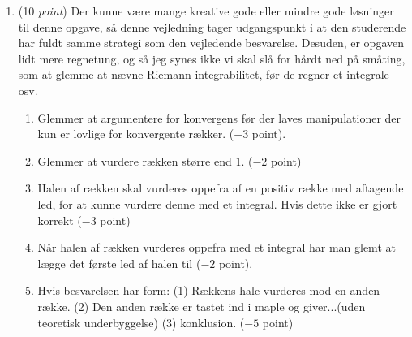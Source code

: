 \documentclass{article}
\begin{document}
\begin{opg}\hfill
	\begin{enumerate}
			\item (10 \emph{point}) Der kunne være mange kreative gode eller mindre gode løsninger til denne opgave, så denne vejledning tager udgangspunkt i at den studerende har fuldt samme strategi som den vejledende besvarelse. Desuden, er opgaven lidt mere regnetung, og så jeg synes ikke vi skal slå for hårdt ned på småting, som at glemme at nævne Riemann integrabilitet, før de regner et integrale osv.
			\begin{enumerate}[label=(\roman*)]
				\item Glemmer at argumentere for konvergens før der laves manipulationer der kun er lovlige for konvergente rækker. ($ -3 $ point).
				\item Glemmer at vurdere rækken større end $ 1 $. ($ -2 $ point)
				\item Halen af rækken skal vurderes oppefra af en positiv række med aftagende led, for at kunne vurdere denne med et integral. Hvis dette ikke er gjort korrekt ($ -3 $ point)
				\item Når halen af rækken vurderes oppefra med et integral har man glemt at lægge det første led af halen til ($ -2 $ point).
				\item Hvis besvarelsen har form: (1) Rækkens hale vurderes mod en anden række. (2) Den anden række er tastet ind i maple og giver...(uden teoretisk underbyggelse) (3) konklusion. ($ -5 $ point)
			\end{enumerate}
	\end{enumerate}
\end{opg}
\end{document}
